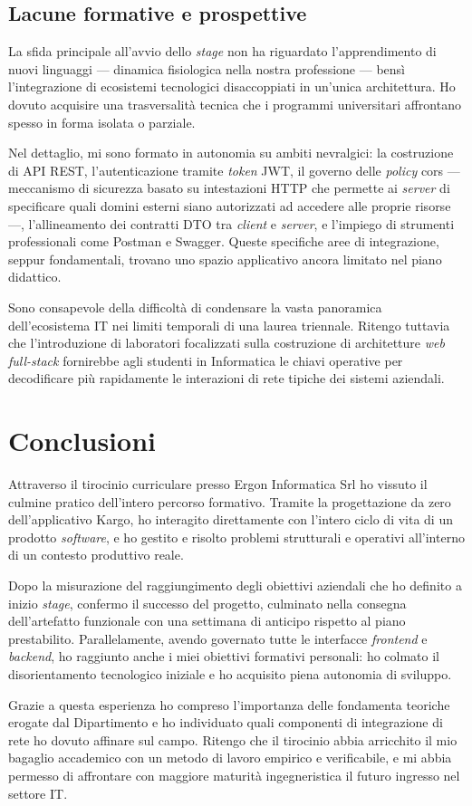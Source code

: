 \subsection{Lacune formative e prospettive}
La sfida principale all'avvio dello \textit{stage} non ha riguardato l'apprendimento di nuovi linguaggi --- dinamica fisiologica nella nostra professione --- bensì l'integrazione di ecosistemi tecnologici disaccoppiati in un'unica architettura. Ho dovuto acquisire una trasversalità tecnica che i programmi universitari affrontano spesso in forma isolata o parziale.

Nel dettaglio, mi sono formato in autonomia su ambiti nevralgici: la costruzione di API REST, l'autenticazione tramite \textit{token} JWT, il governo delle \textit{policy} \gls{cors} --- meccanismo di sicurezza basato su intestazioni HTTP che permette ai \textit{server} di specificare quali domini esterni siano autorizzati ad accedere alle proprie risorse ---, l'allineamento dei contratti DTO tra \textit{client} e \textit{server}, e l'impiego di strumenti professionali come Postman e Swagger. Queste specifiche aree di integrazione, seppur fondamentali, trovano uno spazio applicativo ancora limitato nel piano didattico.

Sono consapevole della difficoltà di condensare la vasta panoramica dell'ecosistema IT nei limiti temporali di una laurea triennale. Ritengo tuttavia che l'introduzione di laboratori focalizzati sulla costruzione di architetture \textit{web full-stack} fornirebbe agli studenti in Informatica le chiavi operative per decodificare più rapidamente le interazioni di rete tipiche dei sistemi aziendali.

\section{Conclusioni}

Attraverso il tirocinio curriculare presso Ergon Informatica Srl ho vissuto il culmine pratico dell'intero percorso formativo. Tramite la progettazione da zero dell'applicativo Kargo, ho interagito direttamente con l'intero ciclo di vita di un prodotto \textit{software}, e ho gestito e risolto problemi strutturali e operativi all'interno di un contesto produttivo reale.

Dopo la misurazione del raggiungimento degli obiettivi aziendali che ho definito a inizio \textit{stage}, confermo il successo del progetto, culminato nella consegna dell'artefatto funzionale con una settimana di anticipo rispetto al piano prestabilito. Parallelamente, avendo governato tutte le interfacce \textit{frontend} e \textit{backend}, ho raggiunto anche i miei obiettivi formativi personali: ho colmato il disorientamento tecnologico iniziale e ho acquisito piena autonomia di sviluppo.

Grazie a questa esperienza ho compreso l'importanza delle fondamenta teoriche erogate dal Dipartimento e ho individuato quali componenti di integrazione di rete ho dovuto affinare sul campo. Ritengo che il tirocinio abbia arricchito il mio bagaglio accademico con un metodo di lavoro empirico e verificabile, e mi abbia permesso di affrontare con maggiore maturità ingegneristica il futuro ingresso nel settore IT.

\newpage